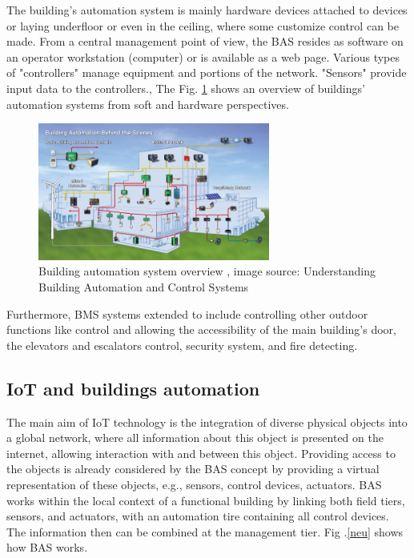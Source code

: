 \documentclass[conference]{IEEEtran}
\begin{document}
The building's automation system is mainly hardware devices attached to devices or laying underfloor or even in the ceiling, where some customize control can be made. From a central management point of view, the BAS resides as software on an operator workstation (computer) or is available as a web page. Various types of "controllers" manage equipment and portions of the network. "Sensors" provide input data to the controllers.\cite{control1}\cite{art2}, The Fig. \ref{BAS} shows an overview of buildings' automation systems from soft and hardware perspectives. 



\begin{figure}[h!]
	\centering
	\includegraphics[width=3in]{BAS.png}
	\caption{\label{BAS}  Building automation system overview
		, image source: Understanding Building Automation and Control Systems
		\cite{art} }
\end{figure}

Furthermore, BMS systems extended to include controlling other outdoor functions like control and allowing the accessibility of the main building's door, the elevators and escalators control, security system, and fire detecting. 
 
 \subsection{IoT and buildings automation }
 

The main aim of IoT technology is the integration of diverse physical objects into a global network, where all information about this object is presented on the internet, allowing interaction with and between this object. Providing access to the objects is already considered by the BAS concept by providing a virtual representation of these objects, e.g., sensors, control devices, actuators. BAS works within the local context of a functional building by linking both field tiers, sensors, and actuators, with an automation tire containing all control devices. The information then can be combined at the management tier. Fig .\ref{neu} shows  how BAS works. 
\end{document}
